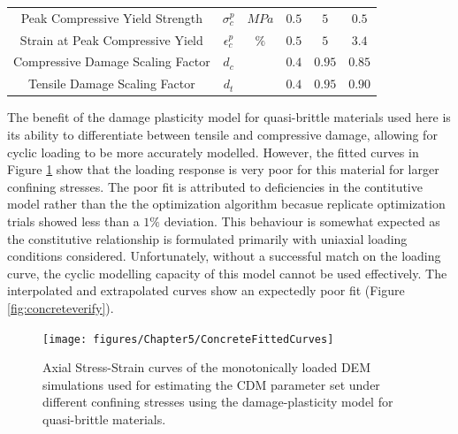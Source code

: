 \begin{table}[!htb]
\begin{tabulary}{\textwidth}{@{}cCcCCC@{}}
Peak Compressive Yield Strength    & $\sigma_c^{p}$                   & $MPa$          & $0.5$                                                           & $5$                                                             & $0.5$                                                             \\
Strain at Peak Compressive Yield   & $\epsilon_c^{p}$                 & $\%$           & $0.5$                                                           & $5$                                                             & $3.4$                                                             \\
Compressive Damage Scaling Factor   & $d_c$ &            & $0.4$                                                          & $0.95$                                                           & $0.85$                                                          \\
Tensile Damage Scaling Factor   & $d_t$ &            & $0.4$                                                           & $0.95$                                                            & $0.90$                                                            \\ \bottomrule
\end{tabulary}
\end{table}

The benefit of the damage plasticity model for quasi-brittle materials used here is its ability to differentiate between tensile and compressive damage, allowing for cyclic loading to be more accurately modelled. However, the fitted curves in Figure \ref{fig:concretefitted} show that the loading response is very poor for this material for larger confining stresses. The poor fit is attributed to deficiencies in the contitutive model rather than the the optimization algorithm becasue replicate optimization trials showed less than a $1\%$ deviation. This behaviour is somewhat expected as the constitutive relationship is formulated primarily with uniaxial loading conditions considered. Unfortunately, without a successful match on the loading curve, the cyclic modelling capacity of this model cannot be used effectively. The interpolated and extrapolated curves show an expectedly poor fit (Figure \ref{fig:concreteverify}).

\begin{figure}[!htb]
\begin{center}
\texttt{[image: figures/Chapter5/ConcreteFittedCurves]}
\caption{{\label{fig:concretefitted} Axial Stress-Strain curves of the monotonically loaded DEM simulations used for estimating the CDM parameter set under different confining stresses using the damage-plasticity model for quasi-brittle materials.%
}}
\end{center}
\end{figure}


